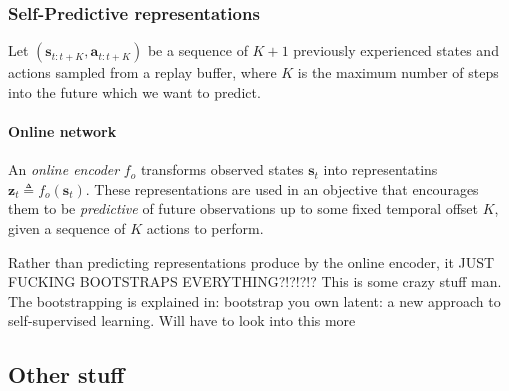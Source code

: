 \documentclass{article}
\begin{document}
\subsubsection{Self-Predictive representations}
Let $ (\bm{s}_{t:t+K}, \bm{a}_{t:t+K} )  $ be a sequence of $ K+1  $ previously experienced states
and actions sampled from a replay buffer, where $ K  $ is the maximum number of steps into the future 
which we want to predict.

\paragraph{Online network}
An \textit{online encoder} $ f_{ o }  $ transforms observed states $ \bm{s}_{t}  $ into 
representatins $ \bm{z}_{t} \triangleq f_{ o } (\bm{s}_{t})  $.
These representations are used in an objective that encourages them
to be \textit{predictive} of future observations up to some fixed
temporal offset $ K  $, given a sequence of $ K  $ actions
to perform.

Rather than predicting representations produce by the online encoder,
it JUST FUCKING BOOTSTRAPS EVERYTHING?!?!?!?
This is some crazy stuff man.
The bootstrapping is explained in: bootstrap you own latent:
a new approach to self-supervised learning.
Will have to look into this more

\subsection{Other stuff}
\end{document}
